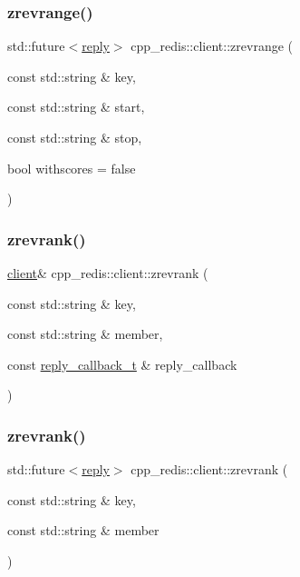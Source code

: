 \subsubsection{\texorpdfstring{zrevrange()}{zrevrange()}\hspace{0.1cm}{\footnotesize\ttfamily [9/9]}}
{\footnotesize\ttfamily std\+::future$<$\hyperlink{classcpp__redis_1_1reply}{reply}$>$ cpp\+\_\+redis\+::client\+::zrevrange (\begin{DoxyParamCaption}\item[{const std\+::string \&}]{key,  }\item[{const std\+::string \&}]{start,  }\item[{const std\+::string \&}]{stop,  }\item[{bool}]{withscores = {\ttfamily false} }\end{DoxyParamCaption})}

\mbox{\label{classcpp__redis_1_1client_a459f90ba39d9f9e90df5b756ec25db8b}} 
\subsubsection{\texorpdfstring{zrevrank()}{zrevrank()}\hspace{0.1cm}{\footnotesize\ttfamily [1/2]}}
{\footnotesize\ttfamily \hyperlink{classcpp__redis_1_1client}{client}\& cpp\+\_\+redis\+::client\+::zrevrank (\begin{DoxyParamCaption}\item[{const std\+::string \&}]{key,  }\item[{const std\+::string \&}]{member,  }\item[{const \hyperlink{classcpp__redis_1_1client_a061a1140d36d2eaeda82b09a0bb3f9f2}{reply\+\_\+callback\+\_\+t} \&}]{reply\+\_\+callback }\end{DoxyParamCaption})}

\mbox{\label{classcpp__redis_1_1client_a9870e21048277805b5eac2ce710089a0}} 
\subsubsection{\texorpdfstring{zrevrank()}{zrevrank()}\hspace{0.1cm}{\footnotesize\ttfamily [2/2]}}
{\footnotesize\ttfamily std\+::future$<$\hyperlink{classcpp__redis_1_1reply}{reply}$>$ cpp\+\_\+redis\+::client\+::zrevrank (\begin{DoxyParamCaption}\item[{const std\+::string \&}]{key,  }\item[{const std\+::string \&}]{member }\end{DoxyParamCaption})}

